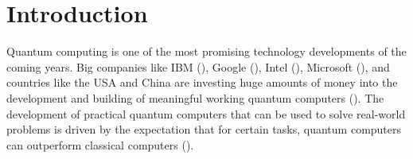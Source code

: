 \documentclass[a4paper,11pt]{article}
\begin{document}
%		
%		
%		
%		
%		
%		
%		

\newpage

\tableofcontents

\newpage

\section{Introduction}
Quantum computing is one of the most promising technology developments of the coming years.
Big companies like IBM (\cite{ibm-quantum}), Google (\cite{google-quantum}), Intel (\cite{intel-quantum}), Microsoft (\cite{microsoft-quantum}), and countries like the USA and China are investing huge amounts of money into the development and building of meaningful working quantum computers (\cite{usa-quantum, china-quantum}).
The development of practical quantum computers that can be used to solve real-world problems is driven by the expectation that for certain tasks, quantum computers can outperform classical computers (\cite{preskill-qc}).
\end{document}
